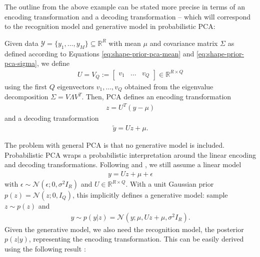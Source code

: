 
The outline from the above example can be stated more precise in terms of
an encoding transformation and a decoding transformation -- 
which will correspond to the recognition model and generative model in
probabilistic PCA:

\begin{definition}
  Given data $\mathcal{Y} = \{y_1, \ldots, y_M\} \subseteq \mathbb{R}^R$ with mean
  $\mu$ and covariance matrix $\Sigma$ as defined according to
  Equations \eqref{eq:shape-prior-pca-mean} and \eqref{eq:shape-prior-pca-sigma},
  we define
  \begin{align}
    U = V_Q := \left[\begin{matrix}v_1 &\ldots& v_Q\end{matrix}\right] \in \mathbb{R}^{R \times Q}
  \end{align}
  using the first $Q$ eigenvectors $v_1,\ldots, v_Q$ obtained
  from the eigenvalue decomposition $\Sigma = V \Lambda V^T$.
  Then, PCA defines an encoding transformation
  \begin{align}
    z = U^T (y - \mu)
  \end{align}
  and a decoding transformation
  \begin{align}
    \tilde{y} = Uz + \mu.
  \end{align}
\end{definition}

The problem with general PCA is that no generative model is included.
Probabilistic PCA wraps a probabilistic interpretation around
the linear encoding and decoding transformations. Following
\cite[Section~12.2]{Bishop:2006} and \cite{TippingBishop:1999}, we still
assume a linear model
\begin{align}
  y = Uz + \mu + \epsilon
\end{align}
with $\epsilon \sim \mathcal{N}(\epsilon;0,\sigma^2I_R)$ and $U \in \mathbb{R}^{R \times Q}$.
With a unit Gaussian prior $p(z) = \mathcal{N}(z;0,I_Q)$, this implicitly
defines a generative model: sample $z \sim p(z)$ and
\begin{align}
  y \sim p(y | z) = \mathcal{N}(y;\mu, Uz + \mu, \sigma^2I_R).\label{eq:shape-prior-ppca-decoding}
\end{align}
Given the generative model, we also need the recognition model, \ie
the posterior $p(z | y)$, representing the encoding transformation.
This can be easily derived using the following
result \cite[Section~2.3]{Bishop:2006}:

